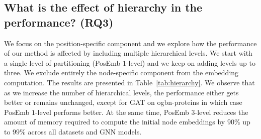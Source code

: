 \documentclass[conference]{IEEEtran}
\begin{document}
\subsection{What is the effect of hierarchy in the performance? (RQ3)}
We focus on the position-specific component and we explore how the performance of our method is affected by including multiple hierarchical levels. We start with a single level of partitioning (PosEmb $1$-level) and we keep on adding levels up to three. We exclude entirely the node-specific component from the embedding computation. The results are presented in Table~\ref{tab:hierarchy}. We observe that as we increase the number of hierarchical levels, the performance either gets better or remains unchanged, except for GAT on ogbn-proteins in which case PosEmb $1$-level performs better. At the same time, PosEmb $3$-level reduces the amount of memory required to compute the initial node embeddings by $90\%$ up to $99\%$ across all datasets and GNN models.

\end{document}
